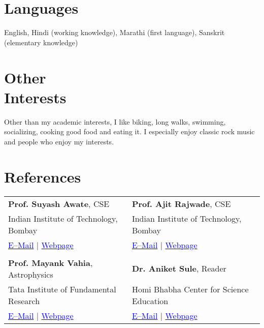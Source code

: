\documentclass[margin,line]{res}
\begin{document}
\begin{resume}
\section{\sc Languages}
English, Hindi (working knowledge), Marathi (first language), Sanskrit (elementary knowledge)

\section{\sc Other \\Interests}
Other than my academic interests, I like biking, long walks, swimming, socializing, cooking good food and eating it. I especially enjoy classic rock music and people who enjoy my interests.

\section{\sc References} 
\begin{tabular}{@{}p{3in}p{3in}}
\textbf{Prof. Suyash Awate}, CSE & \textbf{Prof. Ajit Rajwade}, CSE \\ 
Indian Institute of Technology, Bombay & Indian Institute of Technology, Bombay \\
\href{mailto:suyash@cse.iitb.ac.in}{\textcolor{blue}{E--Mail}} $|$ \href{https://www.cse.iitb.ac.in/~suyash}{\textcolor{blue}{Webpage}} & \href{mailto:ajitvr@cse.iitb.ac.in}{\textcolor{blue}{E--Mail}} $|$ \href{https://www.cse.iitb.ac.in/~ajitvr}{\textcolor{blue}{Webpage}} \\
\vspace{2pt} & \vspace{2pt} \\
\textbf{Prof. Mayank Vahia}, Astrophysics & \textbf{Dr. Aniket Sule}, Reader \\ 
Tata Institute of Fundamental Research & Homi Bhabha Center for Science Education \\
\href{mailto:vahia@tifr.res.in}{\textcolor{blue}{E--Mail}} $|$ \href{http://www.tifr.res.in/~vahia/}{\textcolor{blue}{Webpage}} & \href{mailto:anikets@hbcse.tifr.res.in}{\textcolor{blue}{E--Mail}} $|$ \href{http://www.hbcse.tifr.res.in/people/academic/aniket-sule}{\textcolor{blue}{Webpage}} \\
\end{tabular}
\end{resume}
\end{document}
